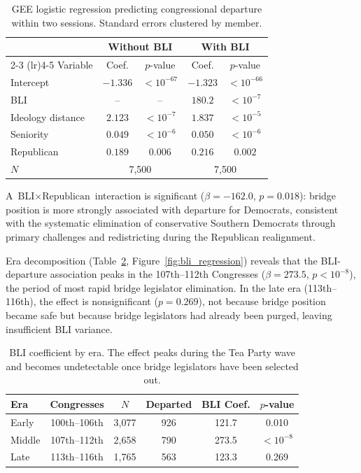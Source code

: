 \documentclass[12pt, a4paper]{article}
\begin{document}
\begin{table}[H]
\centering
\caption{GEE logistic regression predicting congressional departure within two sessions. Standard errors clustered by member.}
\label{tab:bli_regression}
\begin{tabular}{lcccc}
\toprule
 & \multicolumn{2}{c}{Without BLI} & \multicolumn{2}{c}{With BLI} \\
\cmidrule(lr){2-3} \cmidrule(lr){4-5}
Variable & Coef. & $p$-value & Coef. & $p$-value \\
\midrule
Intercept & $-1.336$ & $< 10^{-67}$ & $-1.323$ & $< 10^{-66}$ \\
BLI & -- & -- & $180.2$ & $< 10^{-7}$ \\
Ideology distance & $2.123$ & $< 10^{-7}$ & $1.837$ & $< 10^{-5}$ \\
Seniority & $0.049$ & $< 10^{-6}$ & $0.050$ & $< 10^{-6}$ \\
Republican & $0.189$ & $0.006$ & $0.216$ & $0.002$ \\
\midrule
$N$ & \multicolumn{2}{c}{7,500} & \multicolumn{2}{c}{7,500} \\
\bottomrule
\end{tabular}
\end{table}

A $\text{BLI} \times \text{Republican}$ interaction is significant ($\beta = -162.0$, $p = 0.018$): bridge position is more strongly associated with departure for Democrats, consistent with the systematic elimination of conservative Southern Democrats through primary challenges and redistricting during the Republican realignment.

Era decomposition (Table~\ref{tab:bli_eras}, Figure~\ref{fig:bli_regression}) reveals that the BLI-departure association peaks in the 107th--112th Congresses ($\beta = 273.5$, $p < 10^{-8}$), the period of most rapid bridge legislator elimination. In the late era (113th--116th), the effect is nonsignificant ($p = 0.269$), not because bridge position became safe but because bridge legislators had already been purged, leaving insufficient BLI variance.

\begin{table}[H]
\centering
\caption{BLI coefficient by era. The effect peaks during the Tea Party wave and becomes undetectable once bridge legislators have been selected out.}
\label{tab:bli_eras}
\begin{tabular}{lccccc}
\toprule
Era & Congresses & $N$ & Departed & BLI Coef. & $p$-value \\
\midrule
Early & 100th--106th & 3,077 & 926 & 121.7 & 0.010 \\
Middle & 107th--112th & 2,658 & 790 & 273.5 & $< 10^{-8}$ \\
Late & 113th--116th & 1,765 & 563 & 123.3 & 0.269 \\
\bottomrule
\end{tabular}
\end{table}
\end{document}

